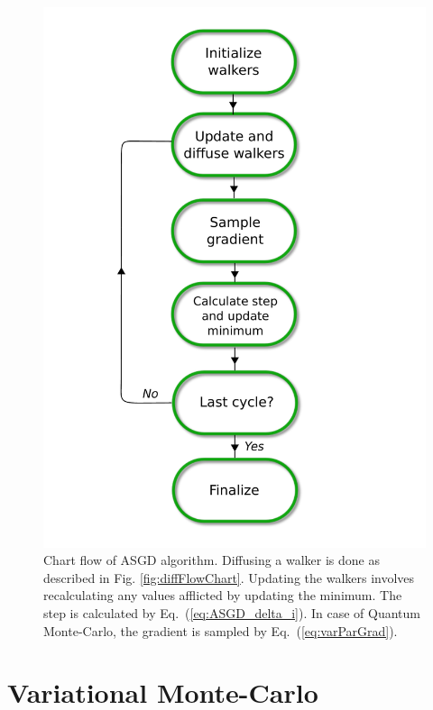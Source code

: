 \begin{figure}
 \begin{center}
  \includegraphics[scale=0.65]{../Graphics/ASGD_UML.pdf}
  \caption{Chart flow of ASGD algorithm. Diffusing a walker is done as described in Fig. \ref{fig:diffFlowChart}. Updating the walkers involves recalculating any values afflicted by updating the minimum. The step is calculated by Eq.~(\ref{eq:ASGD_delta_i}). In case of Quantum Monte-Carlo, the gradient is sampled by Eq.~(\ref{eq:varParGrad}).}
  \label{fig:ASGD_flow}
 \end{center}
\end{figure}
\clearpage


\section{Variational Monte-Carlo}
\label{sec:VMC}

